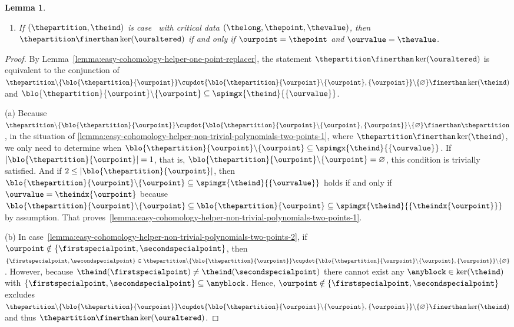 \documentclass[pdftex]{sigma}
\numberwithin{equation}{section}
\newtheorem{Lemma}[Theorem]{Lemma}
\begin{document}
{\begin{Lemma}
\begin{enumerate}
    \item \label{lemma:easy-cohomology-helper-non-trivial-polynomials-two-points-3}
      If $(\thepartition,\theind)$ is case~\scenariothree{} with critical data $(\thelong,\thepoint,\thevalue)$,
      then $\thepartition\finerthan \ker(\ouraltered)$ if and only if $\ourpoint=\thepoint$ and $\ourvalue=\thevalue$.
    \end{enumerate}
  \end{Lemma}
  \begin{proof}
    By Lem\-ma~\ref{lemma:easy-cohomology-helper-one-point-replacer}, the statement $\thepartition\finerthan \ker(\ouraltered)$ is  equivalent to the conjunction of  $\thepartition\backslash\{\blo{\thepartition}{\ourpoint}\}\cupdot \{\blo{\thepartition}{\ourpoint}\backslash \{\ourpoint\}, \{\ourpoint\}\}\backslash \{\varnothing\}\finerthan\ker(\theind)$ and $\blo{\thepartition}{\ourpoint}\backslash \{\ourpoint\}\subseteq\spimgx{\theind}{\{\ourvalue\}}$.

    (a)
    Because $\thepartition\backslash\{\blo{\thepartition}{\ourpoint}\}\cupdot \{\blo{\thepartition}{\ourpoint}\backslash \{\ourpoint\}, \{\ourpoint\}\}\backslash \{\varnothing\}\finerthan\thepartition$, in the situation of \ref{lemma:easy-cohomology-helper-non-trivial-polynomials-two-points-1}, where $\thepartition\finerthan\ker(\theind)$, we only need to determine when $\blo{\thepartition}{\ourpoint}\backslash \{\ourpoint\}\subseteq\spimgx{\theind}{\{\ourvalue\}}$. If $|\blo{\thepartition}{\ourpoint}|=1$, that is, $\blo{\thepartition}{\ourpoint}\backslash \{\ourpoint\}=\varnothing$, this condition is trivially satisfied. And if $2\leq |\blo{\thepartition}{\ourpoint}|$, then $\blo{\thepartition}{\ourpoint}\backslash \{\ourpoint\}\subseteq\spimgx{\theind}{\{\ourvalue\}}$ holds if and only if $\ourvalue=\theindx{\ourpoint}$  because $\blo{\thepartition}{\ourpoint}\backslash \{\ourpoint\}\subseteq\blo{\thepartition}{\ourpoint}\subseteq \spimgx{\theind}{ \{\theindx{\ourpoint}\}}$ by assumption. That proves~\ref{lemma:easy-cohomology-helper-non-trivial-polynomials-two-points-1}.

    (b)
    In case~\ref{lemma:easy-cohomology-helper-non-trivial-polynomials-two-points-2}, if  $\ourpoint\notin\{\firstspecialpoint,\secondspecialpoint\}$, then $\{\firstspecialpoint,\secondspecialpoint\}\in \thepartition\backslash\{\blo{\thepartition}{\ourpoint}\}\cupdot \{\blo{\thepartition}{\ourpoint}\backslash \{\ourpoint\}, \{\ourpoint\}\}\backslash \{\varnothing\}$. However, because $\theind(\firstspecialpoint)\neq \theind(\secondspecialpoint)$ there cannot exist any $\anyblock\in\ker(\theind)$ with $\{\firstspecialpoint,\secondspecialpoint\}\subseteq \anyblock$. Hence, $\ourpoint\notin\{\firstspecialpoint,\secondspecialpoint\}$ excludes  $\thepartition\backslash\{\blo{\thepartition}{\ourpoint}\}\cupdot \{\blo{\thepartition}{\ourpoint}\backslash \{\ourpoint\}, \{\ourpoint\}\}\backslash \{\varnothing\}\finerthan\ker(\theind)$ and thus  $\thepartition\finerthan \ker(\ouraltered)$.


\end{proof}}
\end{document}
